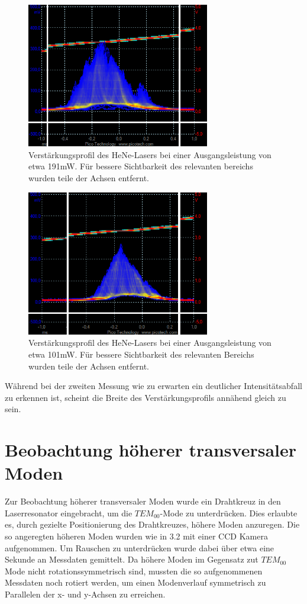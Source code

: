 \documentclass[bigchapter,colorback,accentcolor=tud4b,linedtoc,11pt]{tudreport}
\numberwithin{equation}{subsection}
\begin{document}
\begin{figure}[ht!]
\centering
\includegraphics[width=80mm]{Messdaten/81cm191mW4uW.png}
\caption{Verstärkungsprofil des HeNe-Lasers bei einer Ausgangsleistung von etwa 191mW. Für bessere Sichtbarkeit des relevanten bereichs wurden teile der Achsen entfernt.}
\label{HeNeBreite191mW}
\end{figure}
\begin{figure}[ht!]
\centering
\includegraphics[width=80mm]{Messdaten/81cm101mW4uW.png}
\caption{Verstärkungsprofil des HeNe-Lasers bei einer Ausgangsleistung von etwa 101mW. Für bessere Sichtbarkeit des relevanten Bereichs wurden teile der Achsen entfernt.}
\label{HeNeBreite101mW}
\end{figure}
\FloatBarrier
Während bei der zweiten Messung wie zu erwarten ein deutlicher Intensitätsabfall zu erkennen ist, scheint die Breite des Verstärkungsprofils annähend gleich zu sein.
\section{Beobachtung höherer transversaler Moden}
Zur Beobachtung höherer transversaler Moden wurde ein Drahtkreuz in den Laserresonator eingebracht, um die $TEM_{00}$-Mode zu unterdrücken. Dies erlaubte es, durch gezielte Positionierung des Drahtkreuzes, höhere Moden anzuregen. Die so angeregten höheren Moden wurden wie in 3.2 mit einer CCD Kamera aufgenommen. Um Rauschen zu unterdrücken wurde dabei über etwa eine Sekunde an Messdaten gemittelt. Da höhere Moden im Gegensatz zut $TEM_{00}$ Mode nicht rotationssymmetrisch sind, mussten die so aufgenommenen Messdaten noch rotiert werden, um einen Modenverlauf symmetrisch zu Parallelen der x- und y-Achsen zu erreichen.
\end{document}
